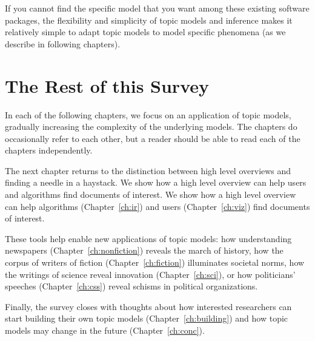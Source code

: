 If you cannot find the specific model that you want among these
existing software packages, the flexibility and simplicity of topic
models and inference makes it relatively simple to adapt topic models
to model specific phenomena (as we describe in following chapters).

\section{The Rest of this Survey}

In each of the following chapters, we focus on an application of topic
models, gradually increasing the complexity of the underlying models.
The chapters do occasionally refer to each other, but a reader should
be able to read each of the chapters independently.

The next chapter returns to the distinction between high level
overviews and finding a needle in a haystack.  We show how a high
level overview can help users and algorithms find documents of
interest.  We show how a high level overview can help
algorithms (Chapter~\ref{ch:ir}) and users (Chapter~\ref{ch:viz}) find documents
of interest.

These tools help enable new applications of topic models: how
understanding newspapers (Chapter~\ref{ch:nonfiction}) reveals the
march of history, how the corpus of writers of fiction
(Chapter~\ref{ch:fiction}) illuminates societal norms, how the
writings of science reveal innovation (Chapter~\ref{ch:sci}), or
how politicians' speeches (Chapter~\ref{ch:css}) reveal schisms in
political organizations.

Finally, the survey closes with thoughts about how interested
researchers can start building their own topic models
(Chapter~\ref{ch:building}) and how topic models may change in the
future (Chapter~\ref{ch:conc}).
